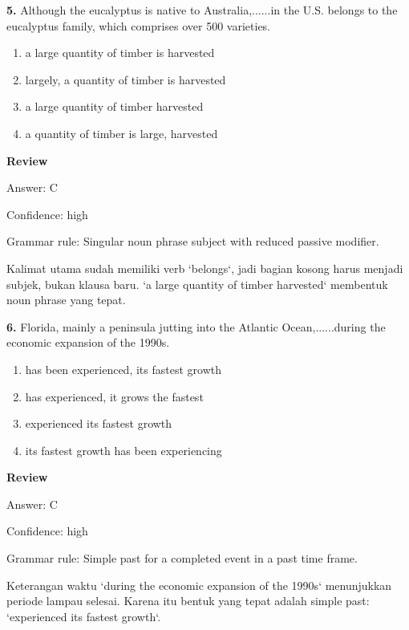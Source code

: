 \documentclass[12pt]{article}
\begin{document}
\noindent\textbf{5.} Although the eucalyptus is native to Australia,......in the U.S. belongs to the eucalyptus family, which comprises over 500 varieties.
\begin{enumerate}[label=(\Alph*),leftmargin=*,itemsep=0.2em]
\item a large quantity of timber is harvested
\item largely, a quantity of timber is harvested
\item a large quantity of timber harvested
\item a quantity of timber is large, harvested
\end{enumerate}
\par
\begingroup
\setlength{\parskip}{0pt}
\setlength{\parindent}{0pt}
\textbf{Review}\par
Answer: C\par
Confidence: high\par
Grammar rule: Singular noun phrase subject with reduced passive modifier.\par
Kalimat utama sudah memiliki verb `belongs`, jadi bagian kosong harus menjadi subjek, bukan klausa baru. `a large quantity of timber harvested` membentuk noun phrase yang tepat.\par
\endgroup
\par
\vspace{0.25\baselineskip}
\noindent\textbf{6.} Florida, mainly a peninsula jutting into the Atlantic Ocean,......during the economic expansion of the 1990s.
\begin{enumerate}[label=(\Alph*),leftmargin=*,itemsep=0.2em]
\item has been experienced, its fastest growth
\item has experienced, it grows the fastest
\item experienced its fastest growth
\item its fastest growth has been experiencing
\end{enumerate}
\par
\begingroup
\setlength{\parskip}{0pt}
\setlength{\parindent}{0pt}
\textbf{Review}\par
Answer: C\par
Confidence: high\par
Grammar rule: Simple past for a completed event in a past time frame.\par
Keterangan waktu `during the economic expansion of the 1990s` menunjukkan periode lampau selesai. Karena itu bentuk yang tepat adalah simple past: `experienced its fastest growth`.\par
\end{document}
